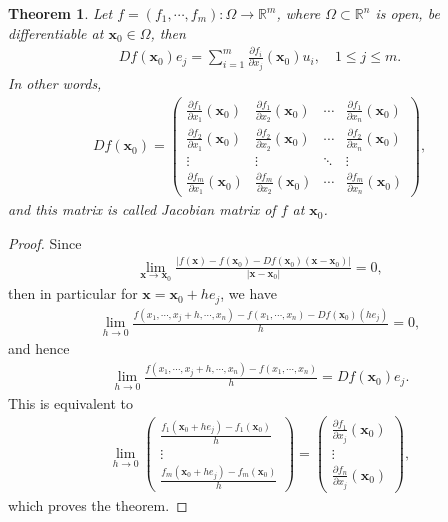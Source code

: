 \documentclass[10pt]{book}
\newtheorem{theorem}{Theorem}[chapter]
\theoremstyle{definition}
\numberwithin{equation}{chapter}
\begin{document}
\begin{theorem}\label{th_75}
Let $f = (f_1, \cdots, f_m): \Omega \to \mathbb{R}^m$, where $\Omega \subset \mathbb{R}^n$ is open, be differentiable at $\mathbf{x}_0 \in \Omega$, then
\begin{align}\label{th_75_equ1}
    Df(\mathbf{x}_0)e_j = \sum^m_{i=1} \frac{\partial f_i}{\partial x_j}(\mathbf{x}_0) u_i, \quad 1 \leq j \leq m.
\end{align}
In other words,
\begin{align*}
    Df(\mathbf{x}_0) = \begin{pmatrix}
        \frac{\partial f_1}{\partial x_1}(\mathbf{x}_0) & \frac{\partial f_1}{\partial x_2}(\mathbf{x}_0) & \cdots & \frac{\partial f_1}{\partial x_n}(\mathbf{x}_0) \\
        \frac{\partial f_2}{\partial x_1}(\mathbf{x}_0) & \frac{\partial f_2}{\partial x_2}(\mathbf{x}_0) & \cdots & \frac{\partial f_2}{\partial x_n}(\mathbf{x}_0) \\
        \vdots & \vdots & \ddots & \vdots \\
        \frac{\partial f_m}{\partial x_1}(\mathbf{x}_0) & \frac{\partial f_m}{\partial x_2}(\mathbf{x}_0) & \cdots & \frac{\partial f_m}{\partial x_n}(\mathbf{x}_0)
    \end{pmatrix},
\end{align*}
and this matrix is called Jacobian matrix of $f$ at $\mathbf{x}_0$.
\end{theorem}
\begin{proof}
Since
\begin{align*}
    \lim_{\mathbf{x} \to \mathbf{x}_0} \frac{\left|f(\mathbf{x}) - f(\mathbf{x}_0) - Df(\mathbf{x}_0) (\mathbf{x} - \mathbf{x}_0)\right|}{\left|\mathbf{x} - \mathbf{x}_0\right|} = 0,
\end{align*}
then in particular for $\mathbf{x} = \mathbf{x}_0 + he_j$, we have
\begin{align*}
    \lim_{h \to 0} \frac{f(x_1,\cdots,x_j+h, \cdots,x_n) - f(x_1,\cdots,x_n) - Df(\mathbf{x}_0)(he_j)}{h} = 0,
\end{align*}
and hence
\begin{align*}
    \lim_{h \to 0} \frac{f(x_1,\cdots,x_j+h, \cdots,x_n) - f(x_1,\cdots,x_n)}{h} = Df(\mathbf{x}_0)e_j.
\end{align*}
This is equivalent to
\begin{align*}
    \lim_{h \to 0} \begin{pmatrix}
        \frac{f_1(\mathbf{x}_0 + he_j) - f_1(\mathbf{x}_0)}{h} \\
        \vdots \\
        \frac{f_m(\mathbf{x}_0 + he_j) - f_m(\mathbf{x}_0)}{h}
    \end{pmatrix} = \begin{pmatrix}
        \frac{\partial f_1}{\partial x_j}(\mathbf{x}_0) \\
        \vdots \\
        \frac{\partial f_n}{\partial x_j}(\mathbf{x}_0)
    \end{pmatrix},
\end{align*}
which proves the theorem.
\end{proof}
\end{document}
